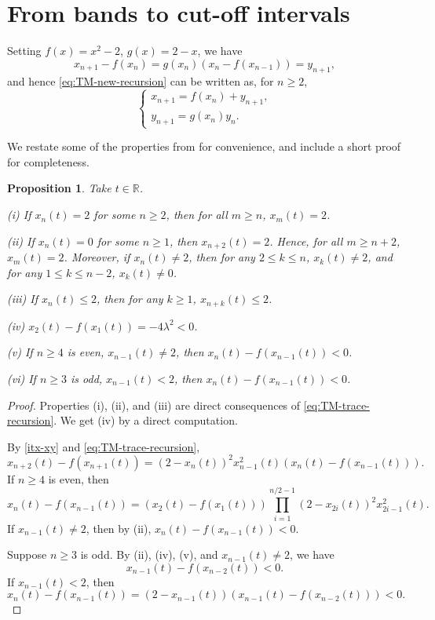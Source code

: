 \documentclass{amsart}
\newtheorem{prop}[thm]{Proposition}
\theoremstyle{definition}
\begin{document}
\section{From bands to cut-off intervals}

Setting $f(x)=x^2-2$, $g(x)=2-x$, we have
\begin{equation}\label{itx-xy}
 x_{n+1}-f(x_n)=g(x_n)(x_{n}-f(x_{n-1}))=y_{n+1},
\end{equation}
and hence \eqref{eq:TM-new-recursion} can be written as, for  $n\ge2$,
\begin{equation}\label{itxy-xy}
\begin{cases}
x_{n+1}=f(x_n)+y_{n+1},\\
y_{n+1}=g(x_n)y_n.
\end{cases}
\end{equation}

We restate some of the properties from \cite{LQ15} for convenience, and include a short proof for completeness. 

\begin{prop}\label{basic}
Take $t\in\mathbb{R}$.

(i) If $x_n(t)=2$ for some $n\ge2$, then for all $m\ge n$, $x_m(t)=2$.

(ii) If $x_n(t)=0$ for some $n\ge1$, then $x_{n+2}(t)=2$. 
Hence, for all $m\ge n+2$, $x_m(t)=2$.
Moreover, if $x_n(t)\ne2$, then for any $2\le k\le n$, $x_k(t)\ne2$,
and for any $1\le k\le n-2$, $x_k(t)\ne0$.

(iii) If $x_n(t)\le2$, then for any $k\ge1$, $x_{n+k}(t)\le2$.

(iv) $x_2(t)-f(x_1(t))=-4\lambda^2< 0$.


(v) If $n\ge4$ is even, $x_{n-1}(t)\ne2$, then $x_n(t)-f(x_{n-1}(t))<0$.

(vi) If $n\ge3$ is odd,  $x_{n-1}(t)<2$, then $x_n(t)-f(x_{n-1}(t))<0$.
\end{prop}

\begin{proof}
Properties (i), (ii), and (iii) are direct consequences of \eqref{eq:TM-trace-recursion}.
We get (iv) by a direct computation.

By \eqref{itx-xy} and \eqref{eq:TM-trace-recursion},
$$x_{n+2}(t)-f(x_{n+1}(t))=(2-x_n(t))^2x_{n-1}^2(t)(x_n(t)-f(x_{n-1}(t))).$$
If $n\ge4$ is even, then 
 $$x_n(t)-f(x_{n-1}(t))=(x_2(t)-f(x_1(t)))
 \prod_{i=1}^{n/2-1}(2-x_{2i}(t))^2 x_{2i-1}^2(t).$$
If $x_{n-1}(t)\ne 2$, then by (ii), $x_n(t)-f(x_{n-1}(t))<0$.

Suppose $n\ge3$ is odd. By (ii), (iv), (v),  and $x_{n-1}(t)\ne2$, we have
$$x_{n-1}(t)-f(x_{n-2}(t))<0.$$
If $x_{n-1}(t)<2$, then
$$x_{n}(t)-f(x_{n-1}(t))=(2-x_{n-1}(t))(x_{n-1}(t)-f(x_{n-2}(t)))<0.$$
\end{proof}
\end{document}
